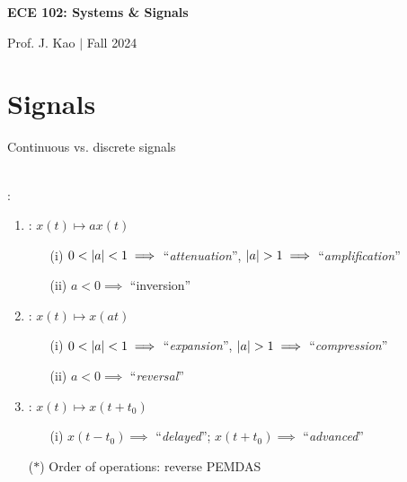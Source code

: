 \documentclass[12pt]{extarticle}
\begin{document}

\begin{center}
    \begin{Large}
        \textbf{ECE 102: Systems \& Signals}
    \end{Large}
    
    \begin{large}
        \vspace{8pt}
        Prof. J. Kao $\vert$ Fall 2024
    \end{large}
\end{center}
\tableofcontents


\pagebreak
\section{Signals}
Continuous vs. discrete signals

~\\ \newp
{}: \begin{enumerate}
    \item {}: $x(t)\mapsto ax(t)$ \begin{enumerate}
        \item[(i)] $0<\left|a\right|<1\implies$ ``\textit{attenuation}'', $\abs{a}>1\implies$ ``\textit{amplification}''
        \item[(ii)] $a<0\implies$ ``inversion''
    \end{enumerate}
    \item {}: $x(t)\mapsto x(at)$ \begin{enumerate}
        \item[(i)] $0<\left|a\right|<1\implies$ ``\textit{expansion}'',  $\abs{a}>1\implies$ ``\textit{compression}''
        \item[(ii)] $a<0\implies$ ``\textit{reversal}''
    \end{enumerate}
    \item {}: $x(t)\mapsto x(t+t_0)$ \begin{enumerate}
        \item[(i)] $x(t-t_0)\implies$ ``\textit{delayed}''; $x(t+t_0)\implies$ ``\textit{advanced}''
    \end{enumerate}
    \item[($\ast$)] Order of operations: reverse PEMDAS
\end{enumerate}
\end{document}
